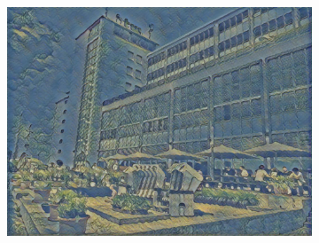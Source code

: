 \begin{figure}[H]
\begin{subfigure}[h]{0.13\textwidth}
        \includegraphics[width=\textwidth]{resources/content/experiments/htw-vgg16_the_olive_trees.jpg}
    \end{subfigure}



\end{figure}
